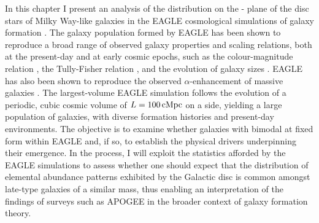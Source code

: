 
In this chapter I present an analysis of the distribution on the \afe{}-\feh{} plane of the disc stars of Milky Way-like galaxies in the EAGLE cosmological simulations of galaxy formation \citep{2015MNRAS.446..521S,2015MNRAS.450.1937C}. The galaxy population formed by EAGLE has been shown to reproduce a broad range of observed galaxy properties and scaling relations, both at the present-day and at early cosmic epochs, such as the colour-magnitude relation \citep{2015MNRAS.452.2879T,2016MNRAS.460.3925T,2017MNRAS.470..771T}, the Tully-Fisher relation \citep{2017MNRAS.464.4736F} , and the evolution of galaxy sizes \citep{2017MNRAS.465..722F}. EAGLE has also been shown to reproduce the observed $\alpha$-enhancement of massive galaxies \citep{2016MNRAS.461L.102S}. The largest-volume EAGLE simulation follows the evolution of a periodic, cubic cosmic volume of $L=100\,{\rm cMpc}$ on a side, yielding a large population of galaxies, with diverse formation histories and present-day environments. The objective is to examine whether galaxies with bimodal \afe{} at fixed \feh{} form within EAGLE and, if so, to establish the physical drivers underpinning their emergence. In the process, I will exploit the statistics afforded by the EAGLE simulations to assess whether one should expect that the distribution of elemental abundance patterns exhibited by the Galactic disc is common amongst late-type galaxies of a similar mass, thus enabling an interpretation of the findings of surveys such as APOGEE in the broader context of galaxy formation theory. 

